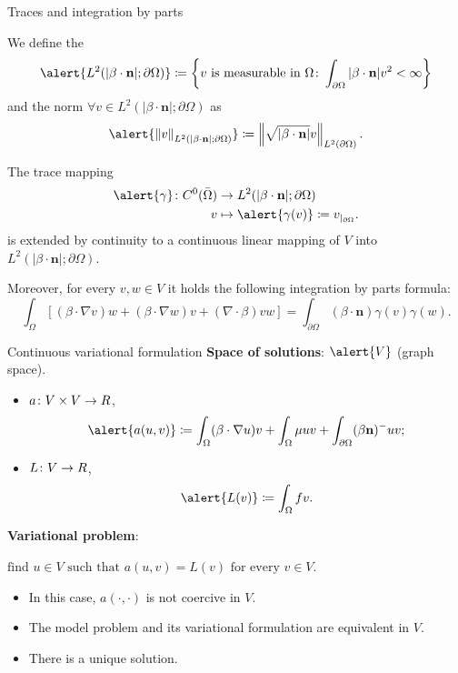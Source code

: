 	\begin{frame}[allowframebreaks]{Traces and integration by parts}
		\begin{definicion}
			We define the  $$\alert{L^2(|\beta\cdot\mathbf{n}|;\partial\Omega)}\coloneqq\left\{v\text{ is measurable in }\Omega\colon\int_{\partial\Omega}|\beta\cdot\mathbf{n}|v^2<\infty \right\}$$ and the norm $\forall v\in L^2(|\beta\cdot\mathbf{n}|;\partial\Omega)$ as $$\alert{\norma{v}_{L^2(|\beta\cdot\mathbf{n}|;\partial\Omega)}}\coloneqq\norma{\sqrt{|\beta\cdot\mathbf{n}|}v}_{L^2(\partial\Omega)}.$$
			\end{definicion}
	\begin{lemma}
	The trace mapping
	\begin{align*}
	\alert{\gamma}\colon {C}^0(\bar{\Omega})&\to L^2(|\beta\cdot\mathbf{n}|;\partial\Omega)\\
	v	&\mapsto\alert{\gamma(v)}\coloneqq v_{|_{\partial\Omega}}.
	\end{align*}
	is extended by continuity to a continuous linear mapping of $V$ into $L^2(|\beta\cdot\mathbf{n}|;\partial\Omega)$.
	 
	
	Moreover, for every $v,w\in V$ it holds the following integration by parts formula: $$\int_\Omega\left[(\beta\cdot\nabla v)w+(\beta\cdot\nabla w)v+(\nabla\cdot\beta)vw\right]=\int_{\partial\Omega}(\beta\cdot \mathbf{n})\gamma(v)\gamma(w).$$
	\end{lemma}
	
	\end{frame}
	
	\begin{frame}{Continuous variational formulation}
	\textbf{Space of solutions}: $\alert{V}$ (graph space).
	\begin{itemize}\itemsep1em
		\item $a\colon V\times V\to \relax R$, $$\alert{a(u,v)}\coloneqq\int_\Omega(\beta\cdot\nabla u)v+\int_\Omega\mu u v+\int_{\partial\Omega}(\beta\mathbf{n})^-uv;$$
		\item $L\colon V\to\relax R$, $$\alert{L(v)}\coloneqq\int_\Omega f v.$$
	\end{itemize}
	\textbf{Variational problem}:
	\begin{block}{}
		\begin{center}
			$\text{find }u\in V\text{ such that }a(u,v)=L(v)\text{ for every } v\in V.$
		\end{center}
	\end{block}
	
	\begin{itemize}%
		\item In this case, $a(\cdot,\cdot)$ is \alert{not coercive in $V$}.
		\item The model problem and its variational formulation are \alert{equivalent} in $V$.
		\item There is a unique solution.
	\end{itemize}
	
	\end{frame}

